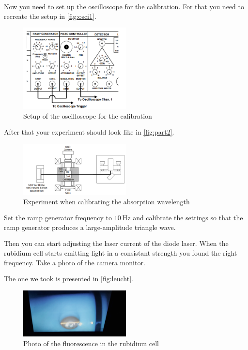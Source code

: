 Now you need to set up the oscilloscope for the calibration. For that you need to recreate the setup in \autoref{fig:osci1}.

\begin{figure}
    \centering
    \includegraphics[width=0.5\textwidth]{images/generator.png}
    \caption{Setup of the oscilloscope for the calibration \cite{V60}}
    \label{fig:osci1}
\end{figure}

After that your experiment should look like in \autoref{fig:part2}.

\begin{figure}
    \centering
    \includegraphics[width=0.5\textwidth]{images/part2.png}
    \caption{Experiment when calibrating the absorption wavelength \cite{V60}}
    \label{fig:part2}
\end{figure}

Set the ramp generator frequency to $\SI{10}{\hertz}$ and calibrate the settings so that the ramp generator produces a large-amplitude triangle wave.

Then you can start adjusting the laser current of the diode laser.
When the rubidium cell starts emitting light in a consistant strength you found the right frequency.
Take a photo of the camera monitor.

The one we took is presented in \autoref{fig:leucht}.

\begin{figure}
    \centering
    \includegraphics[width=0.5\textwidth]{images/photo_fluorescence.jpg}
    \caption{Photo of the fluorescence in the rubidium cell}
    \label{fig:leucht}
\end{figure}

